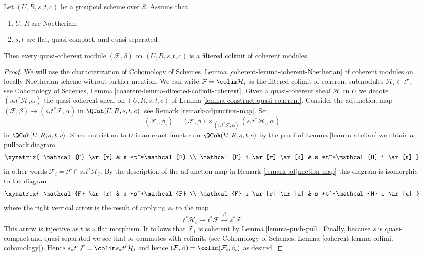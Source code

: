 \begin{lemma}
\label{lemma-colimit-coherent}
Let $(U, R, s, t, c)$ be a groupoid scheme over $S$.
Assume that
\begin{enumerate}
\item $U$, $R$ are Noetherian,
\item $s, t$ are flat, quasi-compact, and quasi-separated.
\end{enumerate}
Then every quasi-coherent module $(\mathcal{F}, \beta)$ on $(U, R, s, t, c)$
is a filtered colimit of coherent modules.
\end{lemma}

\begin{proof}
We will use the characterization of Cohomology of Schemes, Lemma
\ref{coherent-lemma-coherent-Noetherian} of coherent modules on locally
Noetherian scheme without further mention. We can write
$\mathcal{F} = \colim \mathcal{H}_i$ as the filtered colimit
of coherent submodules $\mathcal{H}_i \subset \mathcal{F}$, see
Cohomology of Schemes, Lemma \ref{coherent-lemma-directed-colimit-coherent}.
Given a quasi-coherent sheaf $\mathcal{H}$ on $U$ we denote
$(s_*t^*\mathcal{H}, \alpha)$ the quasi-coherent sheaf on $(U, R, s, t, c)$ of
Lemma \ref{lemma-construct-quasi-coherent}. Consider the adjunction map
$(\mathcal{F}, \beta) \to (s_*t^*\mathcal{F}, \alpha)$ in
$\QCoh(U, R, s, t, c)$, see Remark \ref{remark-adjunction-map}.
Set
$$
(\mathcal{F}_i, \beta_i) =
(\mathcal{F}, \beta)
\times_{(s_*t^*\mathcal{F}, \alpha)}
(s_*t^*\mathcal{H}_i, \alpha)
$$
in $\QCoh(U, R, s, t, c)$. Since restriction to $U$ is an exact functor
on $\QCoh(U, R, s, t, c)$  by the proof of Lemma \ref{lemma-abelian}
we obtain a pullback diagram
$$
\xymatrix{
\mathcal{F} \ar[r] & s_*t^*\mathcal{F} \\
\mathcal{F}_i \ar[r] \ar[u] & s_*t^*\mathcal{H}_i \ar[u]
}
$$
in other words $\mathcal{F}_i = \mathcal{F} \cap s_*t^*\mathcal{H}_i$.
By the description of the adjunction map in Remark \ref{remark-adjunction-map}
this diagram is isomorphic to the diagram
$$
\xymatrix{
\mathcal{F} \ar[r] & s_*s^*\mathcal{F} \\
\mathcal{F}_i \ar[r] \ar[u] & s_*t^*\mathcal{H}_i \ar[u]
}
$$
where the right vertical arrow is the result of applying $s_*$ to the map
$$
t^*\mathcal{H}_i \to t^*\mathcal{F} \xrightarrow{\beta} s^*\mathcal{F}
$$
This arrow is injective as $t$ is a flat morphism. It follows that
$\mathcal{F}_i$ is coherent by Lemma \ref{lemma-push-pull}.
Finally, because $s$ is quasi-compact and quasi-separated we see that
$s_*$ commutes with colimits (see
Cohomology of Schemes, Lemma \ref{coherent-lemma-colimit-cohomology}).
Hence $s_*t^*\mathcal{F} = \colim s_*t^*\mathcal{H}_i$ and hence
$(\mathcal{F}, \beta) = \colim (\mathcal{F}_i, \beta_i)$ as desired.
\end{proof}

